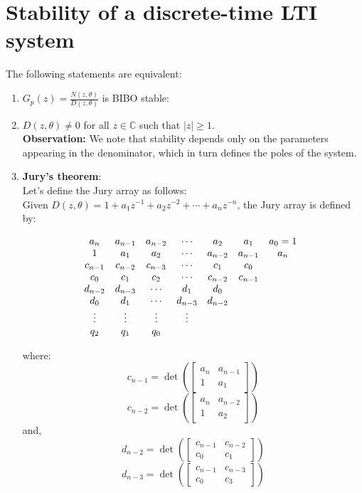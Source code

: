 \section{Stability of a discrete-time LTI system}
The following statements are equivalent:
\begin{enumerate}
    \item \( G_p(z) = \frac{N(z, \theta)}{D(z, \theta)} \) is BIBO stable:
    
    \item \( D(z, \theta) \neq 0 \)   for all \( z \in \mathbb{C} \) such that \( |z| \geq 1 \).\\
    
    \textbf{Observation:} We note that stability depends only on the parameters appearing in the denominator, which in turn defines the poles of the system.
    \newpage
    \item \textbf{Jury's theorem}:\\
    Let's define the Jury array as follows: \\
    
    Given \( D(z,\theta) = 1 + a_1 z^{-1} + a_2
    z^{-2} + \cdots + a_n z^{-n} \), the Jury array is defined by:

\[
\begin{array}{*{7}{c}@{\hspace{10pt}}}
    a_n & a_{n-1} & a_{n-2} & \cdots & a_2 & a_1 & a_0 = 1 \\
    1 & a_1 & a_2 & \cdots & a_{n-2} & a_{n-1} & a_n \\
    c_{n-1} & c_{n-2} & c_{n-3} & \cdots & c_1 & c_0 &  \\
    c_0 & c_1 & c_2 & \cdots & c_{n-2} & c_{n-1} &  \\
    d_{n-2} & d_{n-3} & \cdots & d_1 & d_0 & & \\
    d_0 & d_1 & \cdots & d_{n-3} & d_{n-2} & & \\
    \vdots & \vdots & \vdots & \vdots &  &  &  \\
    q_2 & q_1 & q_0 & & & & 
\end{array}
\]


    where:
    \[
    c_{n-1} = \det\left( \begin{bmatrix}
        a_n & a_{n-1} \\
        1   & a_1
    \end{bmatrix} \right)
    \]
    \[
    c_{n-2} = \det\left( \begin{bmatrix}
        a_n & a_{n-2} \\
        1   & a_2
    \end{bmatrix} \right)
    \]
    and,
    \[
    d_{n-2} = \det\left( \begin{bmatrix}
        c_{n-1} & c_{n-2} \\
        c_0   & c_1
    \end{bmatrix} \right)
    \]
   \[
    d_{n-3} = \det\left( \begin{bmatrix}
        c_{n-1} & c_{n-3} \\
        c_0   & c_3
    \end{bmatrix} \right)
    \]


\end{enumerate}

